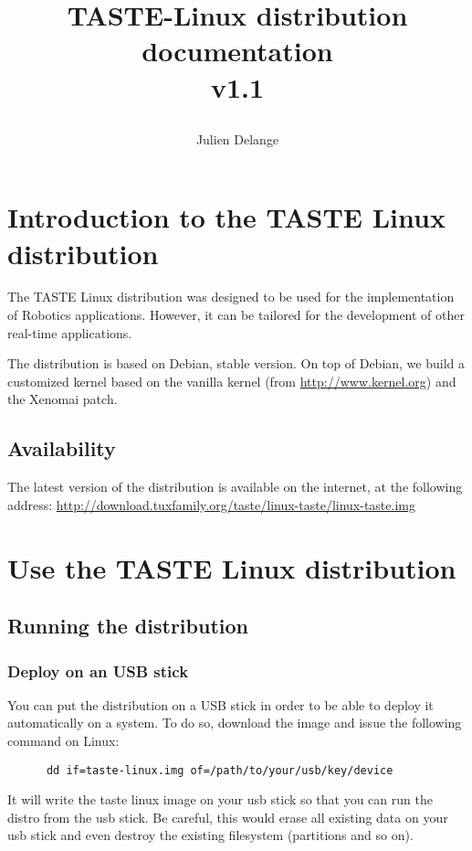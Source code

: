 \documentclass[11pt]{book}
\title{
\centerline{\epsfig{file=imgs/logo-taste.pdf,width=.75\textwidth}}
TASTE-Linux distribution documentation \\ v1.1}
\author{Julien Delange}
\begin{document}
\maketitle

\newpage

\tableofcontents

\newpage

\chapter{Introduction to the TASTE Linux distribution}
The TASTE Linux distribution was designed to be used for the implementation of
Robotics applications. However, it can be tailored for the development of other
real-time applications.

The distribution is based on Debian, stable version. On top of Debian, we build
a customized kernel based on the vanilla kernel (from
\url{http://www.kernel.org}) and the Xenomai patch.

   \section{Availability}
   The latest version of the distribution is available on the internet, at the
   following address:
   \url{http://download.tuxfamily.org/taste/linux-taste/linux-taste.img}


\chapter{Use the TASTE Linux distribution}

   \section{Running the distribution}
      \subsection{Deploy on an USB stick}
      You can put the distribution on a USB stick in order to be able to deploy
      it automatically on a system. To do so, download the image and issue the
      following command on Linux:
      \begin{verbatim}
      dd if=taste-linux.img of=/path/to/your/usb/key/device
      \end{verbatim}

      It will write the taste linux image on your usb stick so that you can run
      the distro from the usb stick. Be careful, this would erase all existing
      data on your usb stick and even destroy the existing filesystem
      (partitions and so on).
\end{document}
